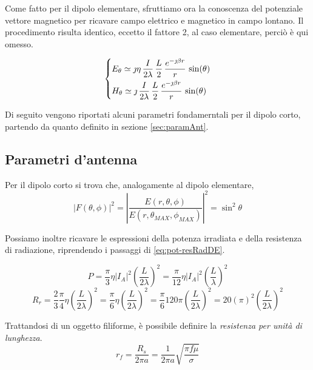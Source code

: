 \bigbreak
Come fatto per il dipolo elementare, sfruttiamo ora la conoscenza del potenziale vettore magnetico per ricavare campo elettrico e magnetico in campo lontano.
Il procedimento risulta identico, eccetto il fattore 2, al caso elementare, perciò è qui omesso.

\begin{equation}\begin{dcases}
	E_\theta
	\simeq \jmath \eta\,\frac{I}{2\lambda}\, \frac{L}{2} \, \frac{e^{-\jmath \beta r}}{r} \, \sin(\theta) \\
	H_\theta
	\simeq \jmath \,\frac{I}{2\lambda}\, \frac{L}{2} \, \frac{e^{-\jmath \beta r}}{r} \, \sin(\theta) \\
\end{dcases}\end{equation}

Di seguito vengono riportati alcuni parametri fondamerntali per il dipolo corto, partendo da quanto definito in sezione \ref{sec:paramAnt}.

\subsection{Parametri d'antenna}

Per il dipolo corto si trova che, analogamente al dipolo elementare,
\begin{equation}
\left | F(\theta, \phi) \right |^2 = \left | \frac{E(r, \theta, \phi)}{E(r, \theta_{MAX}, \phi_{MAX})} \right |^2 = \sin^2\theta
\end{equation}

Possiamo inoltre ricavare le espressioni della potenza irradiata e della resistenza di radiazione, riprendendo i passaggi di \autoref{eq:pot-resRadDE}.

\begin{equation*}
P = \frac{\pi}{3} \eta \left | I_A \right |^2 \left(\frac{L}{2 \lambda}\right)^2 = \frac{\pi}{12} \eta \left | I_A \right |^2 \left(\frac{L}{\lambda}\right)^2
\end{equation*}
\begin{equation*}
R_r = \frac{2}{3} \frac{\pi}{4} \eta \left(\frac{L}{2 \lambda}\right)^2 = \frac{\pi}{6} \eta \left(\frac{L}{2 \lambda}\right)^2 = \frac{\pi}{6} 120 \pi	 \left(\frac{L}{2 \lambda}\right)^2 = 20 (\pi)^2 \left(\frac{L}{2 \lambda}\right)^2
\end{equation*}

Trattandosi di un oggetto filiforme, è possibile definire la \emph{resistenza per unità di lunghezza}.
\begin{equation*}
			r_f = \frac{R_s}{2 \pi a} = \frac{1}{2 \pi a} \sqrt{\frac{\pi f \mu }{\sigma}}
		\end{equation*}

